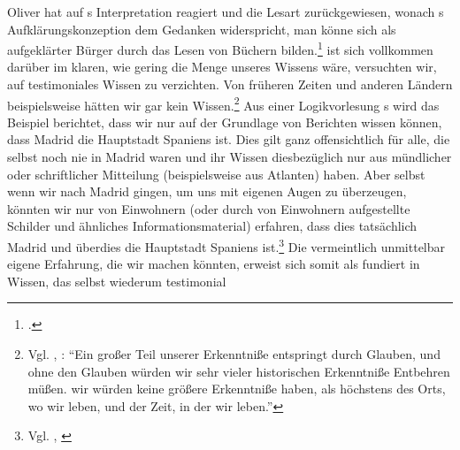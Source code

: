 Oliver  hat auf s
Interpretation reagiert und die Lesart zurückgewiesen, wonach s Aufklärungskonzeption dem Gedanken
widerspricht, man könne sich als aufgeklärter Bürger durch das Lesen von Büchern
bilden.\footnote{\cite[Vgl.][]{Scholz:AutonomieangesichtsepistemischerAbhaengigkeiten2001}.}
 ist sich
 vollkommen darüber im klaren, wie gering die Menge unseres
Wissens wäre, versuchten wir, auf testimoniales Wissen zu verzichten. Von
früheren Zeiten und anderen Ländern beispielsweise hätten wir gar kein
Wissen.\footnote{Vgl.
\cite{Kant:LogikBlomberg1966}, \cite[][XXIV:
245.10--13]{Kant:GesammelteWerke1900ff.}: \enquote{Ein großer Teil unserer
Erkenntniße entspringt durch Glauben, und ohne den Glauben würden wir sehr
vieler historischen Erkenntniße Entbehren müßen.
wir würden keine größere Erkenntniße haben, als höchstens des Orts, wo wir
leben, und der Zeit, in der wir leben.}} Aus einer Logikvorlesung s
wird das Beispiel berichtet, dass wir nur auf der Grundlage von
Berichten wissen können, dass Madrid die Hauptstadt Spaniens ist. Dies gilt ganz
offensichtlich für alle, die selbst noch nie in Madrid waren und ihr Wissen
diesbezüglich nur aus mündlicher oder schriftlicher Mitteilung (beispielsweise
aus Atlanten) haben. Aber selbst wenn wir nach Madrid gingen, um uns mit eigenen
Augen zu überzeugen, könnten wir nur von Einwohnern (oder durch von Einwohnern
aufgestellte Schilder und ähnliches Informationsmaterial) erfahren, dass dies
tatsächlich Madrid und überdies die Hauptstadt Spaniens
ist.\footnote{Vgl. \cite{Kant:WienerLogik1966}, \cite[][XXIV,2:
896.1--9]{Kant:GesammelteWerke1900ff.}} Die vermeintlich unmittelbar eigene
Erfahrung, die wir machen könnten, erweist sich somit als fundiert in Wissen,
das selbst wiederum testimonial
